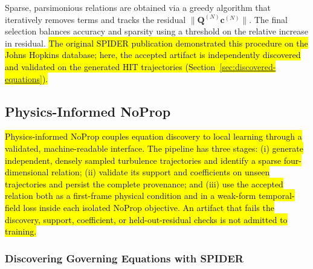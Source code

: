 \documentclass[preprint,12pt]{elsarticle}
\newcommand{\rev}[1]{\hl{#1}}
\begin{document}
Sparse, parsimonious relations are obtained via a greedy algorithm that iteratively removes terms and tracks the residual $\|\mathbf{Q}^{(N)}\mathbf{c}^{(N)}\|$. The final selection balances accuracy and sparsity using a threshold on the relative increase in residual. \rev{The original SPIDER publication demonstrated this procedure on the Johns Hopkins database; here, the accepted artifact is independently discovered and validated on the generated HIT trajectories (Section~\ref{sec:discovered-equations}).}

\subsection{Physics-Informed NoProp}
\label{sec:physics-noprop}

\rev{Physics-informed NoProp couples equation discovery to local learning through a validated, machine-readable interface. The pipeline has three stages: (i) generate independent, densely sampled turbulence trajectories and identify a sparse four-dimensional relation; (ii) validate its support and coefficients on unseen trajectories and persist the complete provenance; and (iii) use the accepted relation both as a first-frame physical condition and in a weak-form temporal-field loss inside each isolated NoProp objective. An artifact that fails the discovery, support, coefficient, or held-out-residual checks is not admitted to training.}

\subsubsection{Discovering Governing Equations with SPIDER}
\label{sec:discovering-equations}
\end{document}
